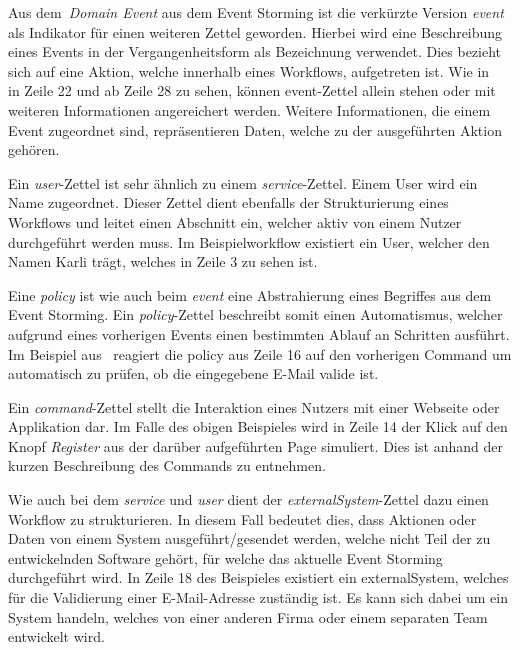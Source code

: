 
Aus dem~\textit{Domain Event} aus dem Event Storming ist die verkürzte Version \textit{event} als Indikator für einen weiteren Zettel geworden.
Hierbei wird eine Beschreibung eines Events in der Vergangenheitsform als Bezeichnung verwendet.
Dies bezieht sich auf eine Aktion, welche innerhalb eines Workflows, aufgetreten ist.
Wie in~ in Zeile 22 und ab Zeile 28 zu sehen, können event-Zettel allein stehen oder mit weiteren Informationen
angereichert werden.
Weitere Informationen, die einem Event zugeordnet sind, repräsentieren Daten, welche zu der ausgeführten Aktion gehören.


Ein \textit{user}-Zettel ist sehr ähnlich zu einem \textit{service}-Zettel.
Einem User wird ein Name zugeordnet.
Dieser Zettel dient ebenfalls der Strukturierung eines Workflows und leitet einen Abschnitt ein, welcher aktiv von einem
Nutzer durchgeführt werden muss.
Im Beispielworkflow existiert ein User, welcher den Namen Karli trägt, welches in Zeile 3 zu sehen ist.

Eine \textit{policy} ist wie auch beim \textit{event} eine Abstrahierung eines Begriffes aus dem Event Storming.
Ein \textit{policy}-Zettel beschreibt somit einen Automatismus, welcher aufgrund eines vorherigen Events einen bestimmten
Ablauf an Schritten ausführt.
Im Beispiel aus~ reagiert die policy aus Zeile 16 auf den vorherigen Command um automatisch zu prüfen,
ob die eingegebene E-Mail valide ist.


Ein \textit{command}-Zettel stellt die Interaktion eines Nutzers mit einer Webseite oder Applikation dar.
Im Falle des obigen Beispieles wird in Zeile 14 der Klick auf den Knopf \textit{Register} aus der darüber aufgeführten Page simuliert.
Dies ist anhand der kurzen Beschreibung des Commands zu entnehmen.


Wie auch bei dem \textit{service} und \textit{user} dient der \textit{externalSystem}-Zettel dazu einen Workflow zu strukturieren.
In diesem Fall bedeutet dies, dass Aktionen oder Daten von einem System ausgeführt/gesendet werden, welche nicht Teil der zu entwickelnden
Software gehört, für welche das aktuelle Event Storming durchgeführt wird.
In Zeile 18 des Beispieles existiert ein externalSystem, welches für die Validierung einer E-Mail-Adresse zuständig ist.
Es kann sich dabei um ein System handeln, welches von einer anderen Firma oder einem separaten Team entwickelt wird.

